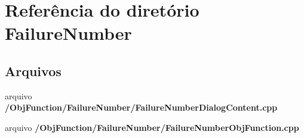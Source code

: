\section{Referência do diretório Failure\+Number}
\label{dir_9286be087c49fabeeba72340e8a921fd}
\subsection*{Arquivos}
\begin{DoxyCompactItemize}
\item 
arquivo {\bf /\+Obj\+Function/\+Failure\+Number/\+Failure\+Number\+Dialog\+Content.\+cpp}
\item 
arquivo {\bf /\+Obj\+Function/\+Failure\+Number/\+Failure\+Number\+Obj\+Function.\+cpp}
\end{DoxyCompactItemize}
